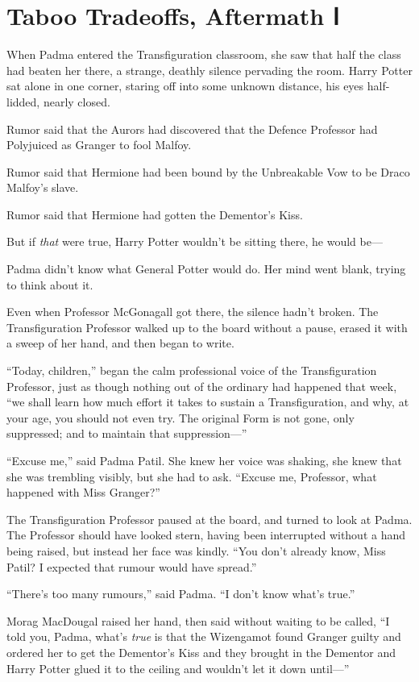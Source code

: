 \chapter{Taboo Tradeoffs, Aftermath Ⅰ}

When Padma entered the Transfiguration classroom, she saw that half the
class had beaten her there, a strange, deathly silence pervading the
room. Harry Potter sat alone in one corner, staring off into some
unknown distance, his eyes half-lidded, nearly closed.

Rumor said that the Aurors had discovered that the Defence Professor had
Polyjuiced as Granger to fool Malfoy.

Rumor said that Hermione had been bound by the Unbreakable Vow to be
Draco Malfoy's slave.

Rumor said that Hermione had gotten the Dementor's Kiss.

But if \emph{that} were true, Harry Potter wouldn't be sitting there, he
would be---

Padma didn't know what General Potter would do. Her mind went blank,
trying to think about it.

Even when Professor McGonagall got there, the silence hadn't broken. The
Transfiguration Professor walked up to the board without a pause, erased
it with a sweep of her hand, and then began to write.

``Today, children,'' began the calm professional voice of the
Transfiguration Professor, just as though nothing out of the ordinary
had happened that week, ``we shall learn how much effort it takes to
sustain a Transfiguration, and why, at your age, you should not even
try. The original Form is not gone, only suppressed; and to maintain
that suppression---''

``Excuse me,'' said Padma Patil. She knew her voice was shaking, she
knew that she was trembling visibly, but she had to ask. ``Excuse me,
Professor, what happened with Miss Granger?''

The Transfiguration Professor paused at the board, and turned to look at
Padma. The Professor should have looked stern, having been interrupted
without a hand being raised, but instead her face was kindly. ``You
don't already know, Miss Patil? I expected that rumour would have
spread.''

``There's too many rumours,'' said Padma. ``I don't know what's true.''

Morag MacDougal raised her hand, then said without waiting to be called,
``I told you, Padma, what's \emph{true} is that the Wizengamot found
Granger guilty and ordered her to get the Dementor's Kiss and they
brought in the Dementor and Harry Potter glued it to the ceiling and
wouldn't let it down until---''

